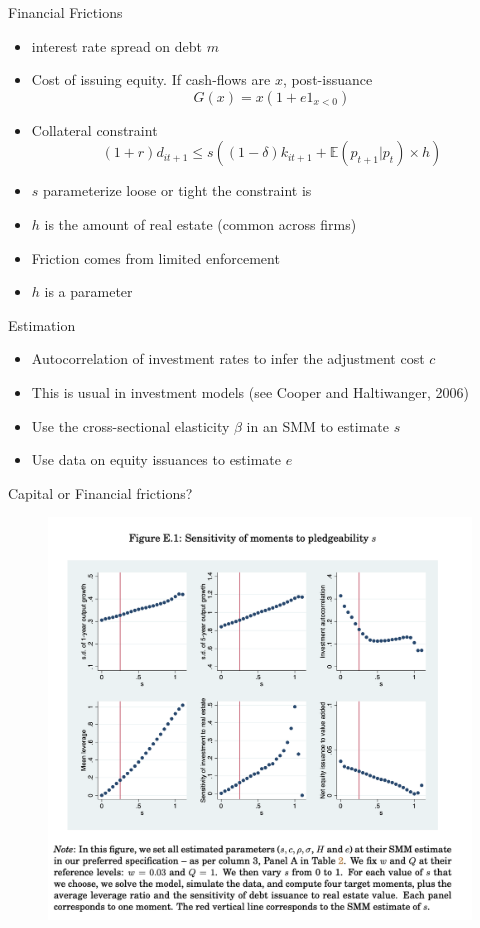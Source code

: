 \documentclass[english,xcolor=svgnames,aspectratio=169]{beamer}
\begin{document}
\begin{frame}{Financial Frictions}
\begin{itemize}
\item interest rate spread on debt $m$
\item Cost of issuing equity. If cash-flows are $x$, post-issuance
\[G(x) = x(1 + e 1_{x < 0})\]
\item Collateral constraint
\[(1+r) d_{it+1} \leq s((1-\delta) k_{it+1} + \mathbb{E}(p_{t+1}|p_t) \times h)\]
\item $s$ parameterize loose or tight the constraint is
\item $h$ is the amount of real estate (common across firms)
\item Friction comes from limited enforcement
\item $h$ is a parameter
\end{itemize}
\end{frame}

\begin{frame}{Estimation}
\begin{itemize}
\item Autocorrelation of investment rates to infer the adjustment cost $c$
\item This is usual in investment models (see Cooper and Haltiwanger, 2006)
\item Use the cross-sectional elasticity $\beta$ in an SMM to estimate $s$
\item Use data on equity issuances to estimate $e$
\end{itemize}
\end{frame}

\begin{frame}{Capital or Financial frictions?}
\begin{figure}
\includegraphics[scale=0.35]{figures/cchst_1}
\end{figure}
\end{frame}
\end{document}
